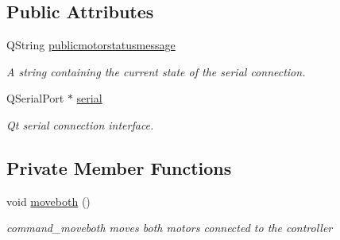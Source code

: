 \subsection*{Public Attributes}
\begin{DoxyCompactItemize}
\item 
\mbox{\label{classMotor_ac64f7613ade081a22859151662b8e866}} 
Q\+String \hyperlink{classMotor_ac64f7613ade081a22859151662b8e866}{publicmotorstatusmessage}
\begin{DoxyCompactList}\small\item\em A string containing the current state of the serial connection. \end{DoxyCompactList}\item 
\mbox{\label{classMotor_a830ca5e3e68b7bc0ffb30650d72b8efb}} 
Q\+Serial\+Port $\ast$ \hyperlink{classMotor_a830ca5e3e68b7bc0ffb30650d72b8efb}{serial}
\begin{DoxyCompactList}\small\item\em Qt serial connection interface. \end{DoxyCompactList}\end{DoxyCompactItemize}
\subsection*{Private Member Functions}
\begin{DoxyCompactItemize}
\item 
\mbox{\label{classMotor_a58e08c8118b2e3272c35086ac6289428}} 
void \hyperlink{classMotor_a58e08c8118b2e3272c35086ac6289428}{moveboth} ()
\begin{DoxyCompactList}\small\item\em command\+\_\+moveboth moves both motors connected to the controller \end{DoxyCompactList}\end{DoxyCompactItemize}
